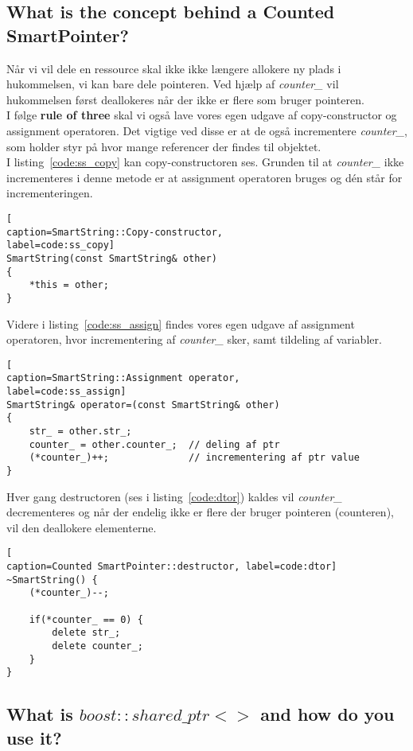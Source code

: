 \subsection{What is the concept behind a Counted SmartPointer?}
Når vi vil dele en ressource skal ikke ikke længere allokere ny plads i hukommelsen, vi kan bare dele pointeren. Ved hjælp af \textit{counter\_} vil hukommelsen først deallokeres når der ikke er flere som bruger pointeren.\\

I følge \textbf{rule of three} skal vi også lave vores egen udgave af copy-constructor og assignment operatoren.
Det vigtige ved disse er at de også incrementere \textit{counter\_}, som holder styr på hvor mange referencer der findes til objektet.\\

I listing~\ref{code:ss_copy} kan copy-constructoren ses. Grunden til at \textit{counter\_} ikke incrementeres i denne metode er at assignment operatoren bruges og dén står for incrementeringen. 

\begin{lstlisting}[
caption=SmartString::Copy-constructor, 
label=code:ss_copy]
SmartString(const SmartString& other)
{
	*this = other;
}
\end{lstlisting}

Videre i listing~\ref{code:ss_assign} findes vores egen udgave af assignment operatoren, hvor incrementering af \textit{counter\_} sker, samt tildeling af variabler.

\begin{lstlisting}[
caption=SmartString::Assignment operator,
label=code:ss_assign]
SmartString& operator=(const SmartString& other)
{
	str_ = other.str_;
	counter_ = other.counter_;	// deling af ptr
	(*counter_)++;				// incrementering af ptr value
}
\end{lstlisting}

Hver gang destructoren (ses i listing~\ref{code:dtor}) kaldes vil \textit{counter\_} decrementeres og når der endelig ikke er flere der bruger pointeren (counteren), vil den deallokere elementerne.

\begin{lstlisting}[
caption=Counted SmartPointer::destructor, label=code:dtor]
~SmartString() {
	(*counter_)--;

	if(*counter_ == 0) {
		delete str_;
		delete counter_;
	}
}
\end{lstlisting}

\subsection{What is $boost::shared\_ptr<>$ and how do you use it?}

